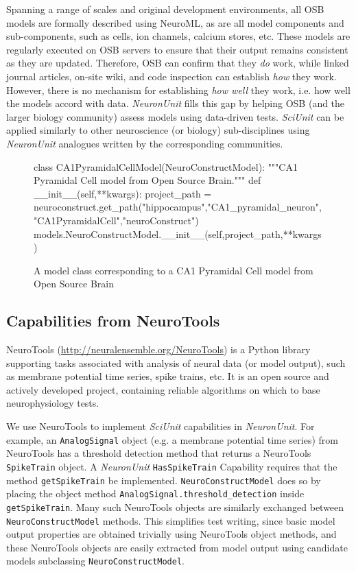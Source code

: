 \documentclass{frontiersSCNS}
\let\verbx\lstinline
\begin{document}
Spanning a range of scales and original development environments, all OSB models are formally described using NeuroML, as are all model components and sub-components, such as cells, ion channels, calcium stores, etc. 
These models are regularly executed on OSB servers to ensure that their output remains consistent as they are updated. 
Therefore, OSB can confirm that they \textit{do} work, while linked journal articles, on-site wiki, and code inspection can establish \textit{how} they work. 
However, there is no mechanism for establishing \textit{how well} they work, i.e. how well the models accord with data. 
\textit{NeuronUnit} fills this gap by helping OSB (and the larger biology community) assess models using data-driven tests. 
\textit{SciUnit} can be applied similarly to other neuroscience (or biology) sub-disciplines using \textit{NeuronUnit} analogues written by the corresponding communities.    

\begin{figure}
\begin{python}
class CA1PyramidalCellModel(NeuroConstructModel):
	"""CA1 Pyramidal Cell model from Open Source Brain."""
	def __init__(self,**kwargs):
		project_path = neuroconstruct.get_path("hippocampus","CA1_pyramidal_neuron","CA1PyramidalCell","neuroConstruct")
		models.NeuroConstructModel.__init__(self,project_path,**kwargs)
\end{python}
\vspace{-5px}
\caption{A model class corresponding to a CA1 Pyramidal Cell model from Open Source Brain}
\label{fig:ca1_model}
\vspace{-15px}
\end{figure}

\subsection{Capabilities from NeuroTools}
NeuroTools (\url{http://neuralensemble.org/NeuroTools}) is a Python library supporting tasks associated with analysis of neural data (or model output), such as membrane potential time series, spike trains, etc. 
It is an open source and actively developed project, containing reliable algorithms on which to base neurophysiology tests.

We use NeuroTools to implement \textit{SciUnit} capabilities in \textit{NeuronUnit}. 
For example, an \verbx{AnalogSignal} object (e.g. a membrane potential time series) from NeuroTools has a threshold detection method that returns a NeuroTools \verbx{SpikeTrain} object. 
A \textit{NeuronUnit} \verbx{HasSpikeTrain} Capability requires that the method \verbx{getSpikeTrain} be implemented. 
\verbx{NeuroConstructModel} does so by placing the object method \verbx{AnalogSignal.threshold_detection} inside \verbx{getSpikeTrain}. 
Many such NeuroTools objects are similarly exchanged between \verbx{NeuroConstructModel} methods. 
This simplifies test writing, since basic model output properties are obtained trivially using NeuroTools object methods, and these NeuroTools objects are easily extracted from model output using candidate models subclassing \verbx{NeuroConstructModel}.  
\end{document}

